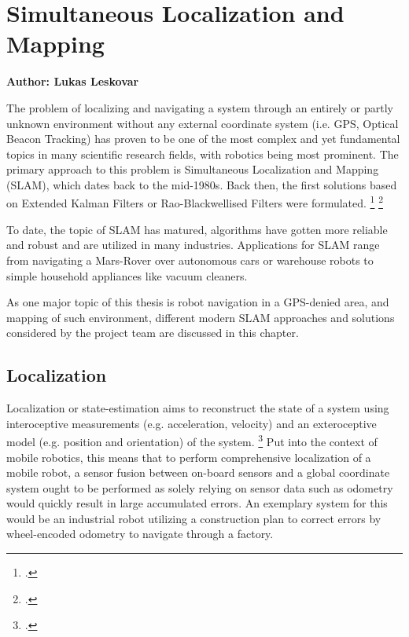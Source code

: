 \chapter{Simultaneous Localization and Mapping}
\label{chapter:slam}

\textbf{Author: Lukas Leskovar} 

The problem of localizing and navigating a system through an entirely or partly unknown environment without any external coordinate system (i.e. GPS, Optical Beacon Tracking) has proven to be one of the most complex and yet fundamental topics in many scientific research fields, with robotics being most prominent. The primary approach to this problem is Simultaneous Localization and Mapping (SLAM), which dates back to the mid-1980s. Back then, the first solutions based on Extended Kalman Filters or Rao-Blackwellised Filters were formulated. \footcite{durrantSlam2006}  \footcite{cadenaSlamFuture2016}

To date, the topic of SLAM has matured, algorithms have gotten more reliable and robust and are utilized in many industries. Applications for SLAM range from navigating a Mars-Rover over autonomous cars or warehouse robots to simple household appliances like vacuum cleaners. 

As one major topic of this thesis is robot navigation in a GPS-denied area, and mapping of such environment, different modern SLAM approaches and solutions considered by the project team are discussed in this chapter.

\section{Localization}
Localization or state-estimation aims to reconstruct the state of a system using interoceptive measurements (e.g. acceleration, velocity) and an exteroceptive model (e.g. position and orientation) of the system. \footcite[Pages 3 - 5]{barfootStateEstimation2017}
Put into the context of mobile robotics, this means that to perform comprehensive localization of a mobile robot, a sensor fusion between on-board sensors and a global coordinate system ought to be performed as solely relying on sensor data such as odometry would quickly result in large accumulated errors.
An exemplary system for this would be an industrial robot utilizing a construction plan to correct errors by wheel-encoded odometry to navigate through a factory. 

